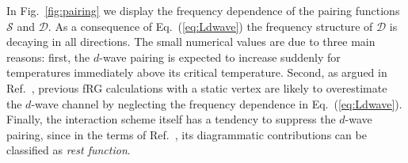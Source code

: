 In Fig.~\ref{fig:pairing} we display the frequency dependence of the pairing functions $\mathcal{S}$ and $\mathcal{D}$. 
As a consequence of Eq.~(\ref{eq:Ldwave}) the frequency structure of $\mathcal{D}$ is decaying in all directions.\cite{Wentzell2016a}
The small numerical values are due to three main reasons: 
first, the $d$-wave pairing is expected to increase suddenly for temperatures immediately above its critical temperature. 
Second, as argued in Ref.~, previous fRG calculations with a static vertex are likely to overestimate the $d$-wave channel by neglecting the frequency dependence in Eq.~(\ref{eq:Ldwave}). 
Finally, the interaction scheme itself has a tendency to suppress the $d$-wave pairing, since in the terms of Ref.~, its diagrammatic contributions can be classified as \emph{rest function}.
 
